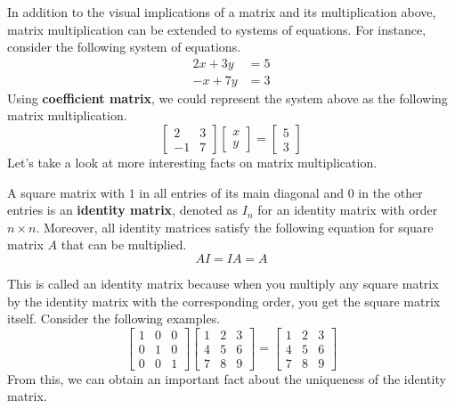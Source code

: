 \documentclass[../main.tex]{subfiles}
\begin{document}
In addition to the visual implications of a matrix and its
multiplication above, matrix multiplication can be extended to
systems of equations. For instance, consider the following system
of equations.
\begin{align*}
    2x + 3y &= 5 \\
    -x + 7y &= 3
\end{align*}
Using \textbf{coefficient matrix}, we could represent the system
above as the following matrix multiplication.
\[
\begin{bmatrix}
    2  & 3 \\
    -1 & 7
\end{bmatrix}
\begin{bmatrix}
    x \\
    y
\end{bmatrix}
=
\begin{bmatrix}
    5 \\
    3
\end{bmatrix}
\]
Let's take a look at more interesting facts on matrix multiplication.

\begin{definition}{}{}
A square matrix with $1$ in all entries of its main diagonal and
$0$ in the other entries is an \textbf{identity matrix}, denoted as
$I_n$ for an identity matrix with order $n \times n$. Moreover,
all identity matrices satisfy the following equation for square
matrix $A$ that can be multiplied.
\[
AI = IA = A
\]
\end{definition}

This is called an identity matrix because when you multiply any
square matrix by the identity matrix with the corresponding order,
you get the square matrix itself. Consider the following examples.
\[
\begin{bmatrix}
    1 & 0 & 0 \\
    0 & 1 & 0 \\
    0 & 0 & 1
\end{bmatrix}
\begin{bmatrix}
    1 & 2 & 3 \\
    4 & 5 & 6 \\
    7 & 8 & 9
\end{bmatrix}
=
\begin{bmatrix}
    1 & 2 & 3 \\
    4 & 5 & 6 \\
    7 & 8 & 9
\end{bmatrix}
\]
From this, we can obtain an important fact about the uniqueness
of the identity matrix.
\end{document}
